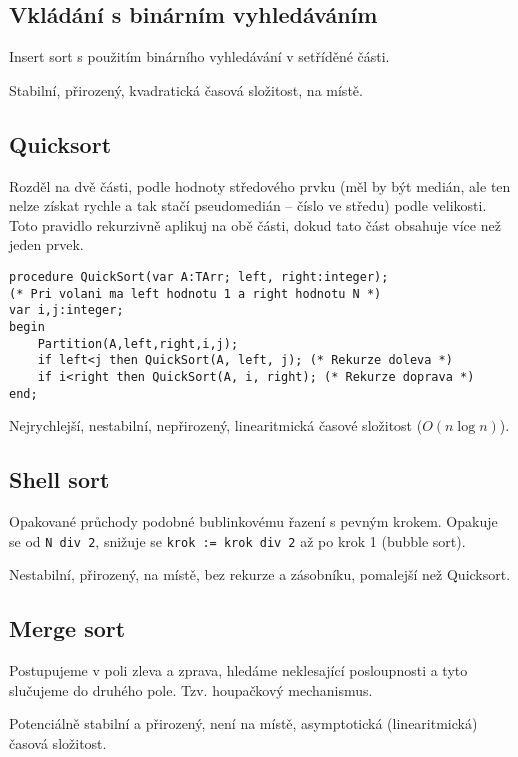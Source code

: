 \documentclass[a4paper, 11pt]{report}
\begin{document}
\subsection{Vkládání s binárním vyhledáváním}

Insert sort s použitím binárního vyhledávání v setříděné části.

Stabilní, přirozený, kvadratická časová složitost, na místě.

\subsection{Quicksort}

Rozděl na dvě části, podle hodnoty středového prvku (měl by být medián, ale ten nelze získat rychle a tak stačí pseudomedián -- číslo ve středu) podle velikosti. Toto pravidlo rekurzivně aplikuj na obě části, dokud tato část obsahuje více než jeden prvek.

\begin{lstlisting}
procedure QuickSort(var A:TArr; left, right:integer);
(* Pri volani ma left hodnotu 1 a right hodnotu N *)
var i,j:integer;
begin
	Partition(A,left,right,i,j);
	if left<j then QuickSort(A, left, j); (* Rekurze doleva *)
	if i<right then QuickSort(A, i, right); (* Rekurze doprava *)
end;
\end{lstlisting}

Nejrychlejší, nestabilní, nepřirozený, linearitmická časové složitost ($O(n \log{n})$).

\subsection{Shell sort}

Opakované průchody podobné bublinkovému řazení s pevným krokem. Opakuje se od \verb|N div 2|, snižuje se \verb|krok := krok div 2| až po krok 1 (bubble sort).

Nestabilní, přirozený, na místě, bez rekurze a zásobníku, pomalejší než Quicksort.

\subsection{Merge sort}

Postupujeme v poli zleva a zprava, hledáme neklesající posloupnosti a tyto slučujeme do druhého pole. Tzv. houpačkový mechanismus.

Potenciálně stabilní a přirozený, není na místě, asymptotická (linearitmická) časová složitost.
\end{document}
